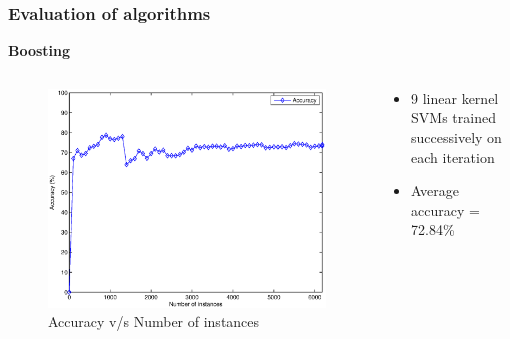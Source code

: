 \documentclass[9pt]{beamer}
\begin{document}
    \begin{frame}
        \frametitle{Evaluation of algorithms}
        \begin{center}
            \textbf{Boosting}
        \end{center}
        \begin{columns}
            \begin{column}{0.5\textwidth}
                \begin{figure}
                    \centering
                    \includegraphics[width=\textwidth]{figures/boosting_accuracy.eps}
                    \caption{Accuracy v/s Number of instances}
                \end{figure}
            \end{column}
            \begin{column}{0.5\textwidth}
                \begin{itemize}
                    \item{9 linear kernel SVMs trained successively on each iteration}
                    \item{Average accuracy = 72.84\%}
                \end{itemize}
            \end{column}
        \end{columns}
    \end{frame}
    
\end{document}

